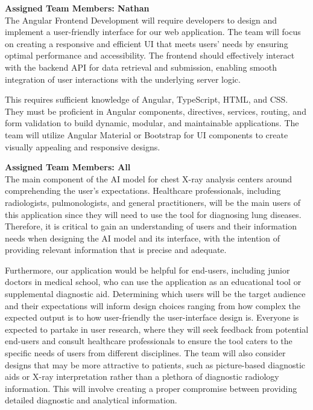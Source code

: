 \documentclass[12pt]{article}
\begin{document}
\begin{enumerate}
\textbf{Assigned Team Members: Nathan} \\
The Angular Frontend Development will require developers to design and implement a user-friendly interface for our web application. The team will focus on creating a responsive and efficient UI that meets users' needs by ensuring optimal performance and accessibility. The frontend should effectively interact with the backend API for data retrieval and submission, enabling smooth integration of user interactions with the underlying server logic.

This requires sufficient knowledge of Angular, TypeScript, HTML, and CSS. They must be proficient in Angular components, directives, services, routing, and form validation to build dynamic, modular, and maintainable applications. The team will utilize Angular Material or Bootstrap for UI components to create visually appealing and responsive designs.


\textbf{Assigned Team Members: All} \\
The main component of the AI model for chest X-ray analysis centers around comprehending the user's expectations. Healthcare professionals, including radiologists, pulmonologists, and general practitioners, will be the main users of this application since they will need to use the tool for diagnosing lung diseases. Therefore, it is critical to gain an understanding of users and their information needs when designing the AI model and its interface, with the intention of providing relevant information that is precise and adequate.

Furthermore, our application would be helpful for end-users, including junior doctors in medical school, who can use the application as an educational tool or supplemental diagnostic aid. Determining which users will be the target audience and their expectations will inform design choices ranging from how complex the expected output is to how user-friendly the user-interface design is. Everyone is expected to partake in user research, where they will seek feedback from potential end-users and consult healthcare professionals to ensure the tool caters to the specific needs of users from different disciplines. The team will also consider designs that may be more attractive to patients, such as picture-based diagnostic aids or X-ray interpretation rather than a plethora of diagnostic radiology information. This will involve creating a proper compromise between providing detailed diagnostic and analytical information.

  
\end{enumerate}
\end{document}
